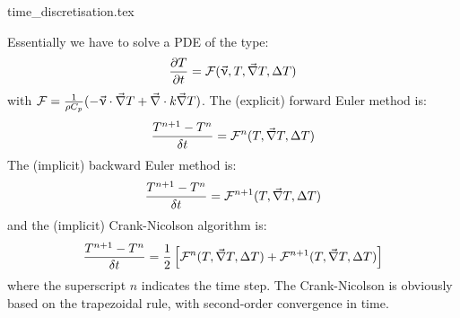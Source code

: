 \begin{flushright} {\tiny {\color{gray} time\_discretisation.tex}} \end{flushright}




Essentially we have to solve a PDE of the type:
\[
\frac{\partial T}{\partial t} = {\cal F}(\vec \upnu,T,\vec\nabla T,\Delta T)
\]
with ${\cal F}=\frac{1}{\rho C_p}(-\vec\upnu\cdot\vec\nabla T + \vec\nabla\cdot k\vec\nabla T)$.
The (explicit) forward Euler method is:
\[
\frac{T^{n+1}-T^n}{\delta t} = {\cal F}^n(T,\vec\nabla T,\Delta T)
\]
The (implicit) backward Euler method is:
\[
\frac{T^{n+1}-T^n}{\delta t} = {\cal F}^{n+1}(T,\vec\nabla T,\Delta T)
\]
and the (implicit) Crank-Nicolson algorithm is:
\[
\frac{T^{n+1}-T^n}{\delta t} = 
\frac{1}{2}
\left[
{\cal F}^{n}(T,\vec\nabla T,\Delta T)
+
{\cal F}^{n+1}(T,\vec\nabla T,\Delta T)
\right]
\]
where the superscript $n$ indicates the time step.
The Crank-Nicolson is obviously based on the trapezoidal rule, with second-order convergence in time.


